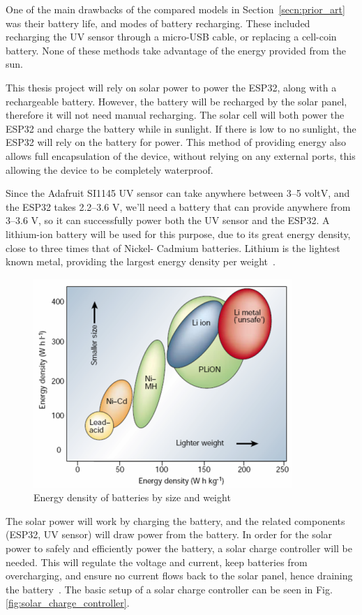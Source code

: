 \documentclass[12pt,openany,a4paper]{book}
\newcommand{\fig}[1]  {Fig.\,\ref{#1}}		%
\newcommand{\secn}[1] {Section~\ref{#1}}	%
\begin{document}
One of the main drawbacks of the compared models in \secn{secn:prior_art} was
their battery life, and modes of battery recharging. These included recharging
the UV sensor through a micro-USB cable, or replacing a cell-coin battery. None
of these methods take advantage of the energy provided from the sun.

This thesis
project will rely on solar power to power the ESP32, along with a rechargeable
battery. However, the battery will be recharged by the solar panel, therefore it
will not need manual recharging. The solar cell will both power the ESP32 and
charge the battery while in sunlight. If there is low to no sunlight, the ESP32
will rely on the battery for power. This method of providing energy also allows
full encapsulation of the device, without relying on any external ports, this
allowing the device to be completely waterproof.

Since the Adafruit SI1145 UV sensor can take
anywhere between 3--5 voltV, and the ESP32 takes 2.2--3.6 V, we'll need a
battery that can provide anywhere from 3--3.6 V, so it can successfully
power both the UV sensor and the ESP32. A lithium-ion battery will be used for
this purpose, due to its great energy density, close to three times that of
Nickel- Cadmium batteries. Lithium is the lightest known metal, providing the
largest energy density per weight~\cite[\fig{fig:energy_density}]{lin}.

\begin{figure}[h]
\centerline{\includegraphics[width=.5\textwidth]{EnergyDensity.png}}
\caption{Energy density of batteries by size and weight}
\label{fig:energy_density}
\end{figure}

The solar
power will work by charging the battery, and the related components (ESP32, UV
sensor) will draw power from the battery. In order for the solar power to safely
and efficiently power the battery, a solar charge controller will be needed.
This will regulate the voltage and current, keep batteries from overcharging,
and ensure no current flows back to the solar panel, hence draining the
battery~\cite{solar_electric}. The basic setup of a solar charge controller can be seen in
\fig{fig:solar_charge_controller}.
\end{document}
